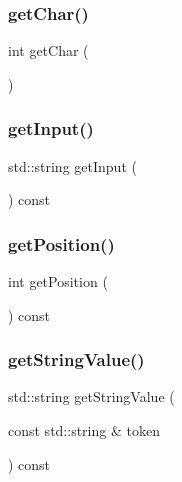 \subsubsection{\texorpdfstring{get\+Char()}{getChar()}}
{\footnotesize\ttfamily int get\+Char (\begin{DoxyParamCaption}{ }\end{DoxyParamCaption})}

\mbox{\label{classTokenScanner_ae2c34694d98dc66a7493339061a4358e}} 
\subsubsection{\texorpdfstring{get\+Input()}{getInput()}}
{\footnotesize\ttfamily std\+::string get\+Input (\begin{DoxyParamCaption}{ }\end{DoxyParamCaption}) const}

\mbox{\label{classTokenScanner_a6c9c9aa34f1ae28cd7a4f150e2df8201}} 
\subsubsection{\texorpdfstring{get\+Position()}{getPosition()}}
{\footnotesize\ttfamily int get\+Position (\begin{DoxyParamCaption}{ }\end{DoxyParamCaption}) const}

\mbox{\label{classTokenScanner_ac9f2b60ecc3007903307c3cb49fd5df1}} 
\subsubsection{\texorpdfstring{get\+String\+Value()}{getStringValue()}}
{\footnotesize\ttfamily std\+::string get\+String\+Value (\begin{DoxyParamCaption}\item[{const std\+::string \&}]{token }\end{DoxyParamCaption}) const}

